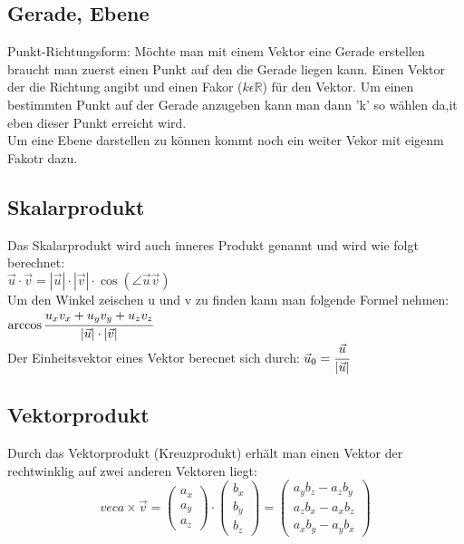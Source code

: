 \documentclass[a4paper,10pt]{scrartcl}
\begin{document}
        \subsection{Gerade, Ebene}
            Punkt-Richtungsform: Möchte man mit einem Vektor eine Gerade erstellen braucht man zuerst einen Punkt auf den die Gerade liegen kann. Einen Vektor der die Richtung angibt 
            und einen Fakor ($k \epsilon \mathbb{R}$) für den Vektor. Um einen bestimmten Punkt auf der Gerade anzugeben kann man dann 'k' so wählen da,it eben dieser Punkt erreicht wird.\\
            Um eine Ebene darstellen zu können kommt noch ein weiter Vekor mit eigenm Fakotr dazu.  

        \subsection{Skalarprodukt}
            Das Skalarprodukt wird auch inneres Produkt genannt und wird wie folgt berechnet: \\
            $\vec{u} \cdot \vec{v} = |\vec{u}| \cdot |\vec{v}| \cdot \cos(\angle \vec{u} \vec{v})$ \\
            Um den Winkel zeischen u und v zu finden kann man folgende Formel nehmen: $\arccos \cfrac{u_xv_x + u_yv_y + u_zv_z}{|\vec{u}|\cdot|\vec{v}|}$ \\
            Der Einheitsvektor eines Vektor berecnet sich durch: $\vec{u}_0 = \cfrac{\vec{u}}{|\vec{u}|}$
        \subsection{Vektorprodukt}
            Durch das Vektorprodukt (Kreuzprodukt) erhält man einen Vektor der rechtwinklig auf zwei anderen Vektoren liegt:
            \[
                vec{a} \times \vec{v} = 
                \begin{pmatrix}
                    a_x\\
                    a_y\\
                    a_z
                \end{pmatrix} \cdot
                \begin{pmatrix}
                    b_x\\
                    b_y\\
                    b_z
                \end{pmatrix}
                = 
                \begin{pmatrix}
                    a_yb_z - a_zb_y\\
                    a_zb_x - a_xb_z\\
                    a_xb_y - a_yb_x
                \end{pmatrix} 
            \]
    
\end{document}
